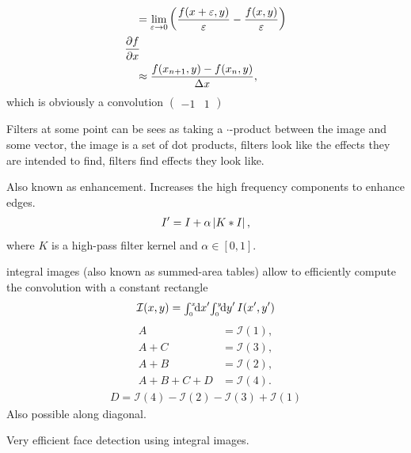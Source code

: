 \begin{compactdesc}
\begin{align*}
				&\quad=\lim_{\varepsilon\to0}\left( \frac{f(x+\varepsilon,y)}{\varepsilon}-\frac{f(x,y)}{\varepsilon} \right)\\
				&\frac{\partial f}{\partial x}\\
				&\quad\approx\frac{f\!\left( x_{n+1},y \right)-f\!\left( x_n,y \right)}{\Delta x},
			\end{align*}
			which is obviously a convolution $\left( \begin{smallmatrix}-1&1\end{smallmatrix} \right)$
		\item[\lp{Filters and templates}] Filters at some point can be sees as taking a $\cdot$-product between the image and some vector, the image is a set of dot products, filters look like the effects they are intended to find, filters find effects they look like.
		\item[\lp{Image sharpening}] Also known as enhancement. Increases the high frequency components to enhance edges. 
			\begin{gather*}
				I'=I+\alpha\left\lvert K*I \right\rvert,
			\end{gather*}
	 where $K$ is a high-pass filter kernel and $\alpha\in [0,1]$.
 \item[\lp{Integral images}] integral images (also known as summed-area tables) allow to efficiently compute the convolution with a constant rectangle
	 \begin{gather*}
		 \mathcal{I}(x,y)={\scriptstyle\int_{0}^{x}}\!\mathrm d{x'}{\scriptstyle\int_{0}^{y}}\!\mathrm d{y'}\, I(x',y')
	 \end{gather*}
	 \begin{align*}
		 A&=\mathcal{I}(1),\\
		 A+C&=\mathcal{I}(3),\\
		 A+B&=\mathcal{I}(2),\\
		 A+B+C+D&=\mathcal{I}(4).
	 \end{align*}
	 \begin{gather*}
		 D=\mathcal{I}(4)-\mathcal{I}(2)-\mathcal{I}(3)+\mathcal{I}(1)
	 \end{gather*}
	 Also possible along diagonal.
 \item[\lp{Viola-Jones cascade face detection}] Very efficient face detection using integral images.
\end{compactdesc}
